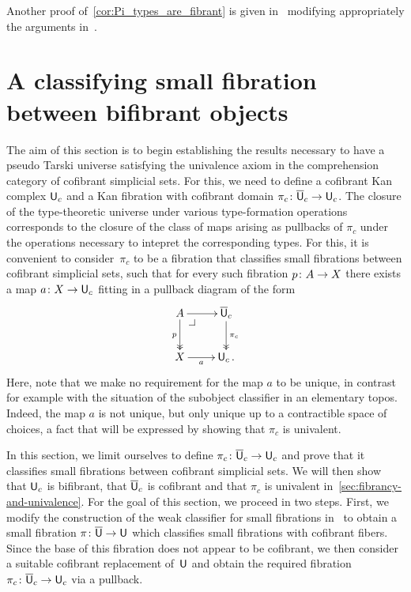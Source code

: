 \documentclass[reqno,10pt,a4paper,oneside,draft]{amsart}
\begin{document}
 
 Another proof of~\cref{cor:Pi_types_are_fibrant} is given in~\cite{GambinoN:anocp} modifying appropriately
the arguments in~\cite{SattlerC:equepu}.


\section{A  classifying small fibration between bifibrant objects}
\label{sec:unifbb}


The aim of this section is to begin establishing the results necessary to have a pseudo Tarski
universe satisfying the univalence axiom in the comprehension category of cofibrant simplicial
sets. For this, we need to define a cofibrant Kan complex $\mathsf{U}_c$ and a Kan 
fibration with cofibrant domain $\pi_c \colon \overline{\mathsf{U}}_c \to \mathsf{U}_c$. The closure of the type-theoretic universe under various type-formation operations
corresponds to the closure of the class of maps arising as pullbacks of $\pi_c$ under the 
operations necessary to intepret the corresponding types. For this, it is convenient to 
consider~$\pi_c$ to be a fibration that classifies small fibrations between cofibrant simplicial
sets, \ie such that for every such fibration $p \colon A \to X$ there exists a map $a \colon X \to \mathsf{U}_c$ fitting in a pullback diagram of the form
\[
\xymatrix{
A \drpullback \ar[r] \ar@{->>}[d]_p   & \UU_c \ar@{->>}[d]^{\pi_c} \\
X \ar[r]_-a &  \U_c \, .}
\]
Here, note that we make no requirement for
the map $a$ to be unique, in contrast for example with the situation of the subobject classifier
in an elementary topos. Indeed, the map $a$ is not unique, but only unique  up to a contractible space
of choices, a fact that will be expressed by showing that $\pi_c$ is univalent. 

In this section, we limit ourselves to define $\pi_c \colon \overline{\mathsf{U}}_c \to \mathsf{U}_c$ and prove that it
classifies small fibrations between cofibrant simplicial sets. We will then show 
that $\mathsf{U}_c$ is bifibrant, that $\overline{\mathsf{U}}_c$ is cofibrant  and that $\pi_c$ is univalent 
in~\cref{sec:fibrancy-and-univalence}. For the goal of this section, we proceed in two steps. First, we modify  the construction of the weak classifier for small fibrations in~\cite{voevodsky-simplicial-model} to obtain a small fibration $\pi \colon \overline{\mathsf{U}} \to \mathsf{U}$ which classifies small fibrations with cofibrant fibers. Since the base of this fibration does not appear to be cofibrant,
we then consider a suitable cofibrant replacement  of~$\mathsf{U}$ and obtain the required fibration $\pi_c \colon \overline{\mathsf{U}}_c \to \mathsf{U}_c$ via a pullback. 
\end{document}
